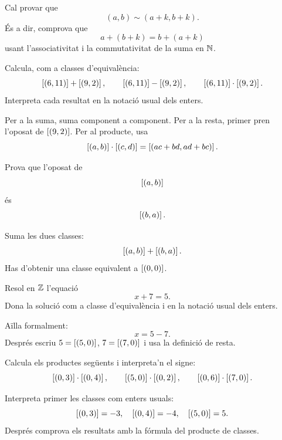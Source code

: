 \begin{indicacio}
Cal provar que
\[
(a,b)\sim(a+k,b+k).
\]
És a dir, comprova que
\[
a+(b+k)=b+(a+k)
\]
usant l'associativitat i la commutativitat de la suma en \(\mathbb{N}\).
\end{indicacio}


\begin{exercici}
Calcula, com a classes d'equivalència:
\[
\left[(6,11)\right]+\left[(9,2)\right],
\qquad
\left[(6,11)\right]-\left[(9,2)\right],
\qquad
\left[(6,11)\right]\cdot\left[(9,2)\right].
\]
Interpreta cada resultat en la notació usual dels enters.
\end{exercici}

\begin{indicacio}
Per a la suma, suma component a component. Per a la resta, primer pren l'oposat de \(\left[(9,2)\right]\). Per al producte, usa
\[
\left[(a,b)\right]\cdot\left[(c,d)\right]
=
\left[(ac+bd,ad+bc)\right].
\]
\end{indicacio}


\begin{exercici}
Prova que l'oposat de
\[
\left[(a,b)\right]
\]
és
\[
\left[(b,a)\right].
\]
\end{exercici}

\begin{indicacio}
Suma les dues classes:
\[
\left[(a,b)\right]+\left[(b,a)\right].
\]
Has d'obtenir una classe equivalent a \(\left[(0,0)\right]\).
\end{indicacio}


\begin{exercici}[Equacions de la forma \(x+a=b\)]
Resol en \(\mathbb{Z}\) l'equació
\[
x+7=5.
\]
Dona la solució com a classe d'equivalència i en la notació usual dels enters.
\end{exercici}

\begin{indicacio}
Aïlla formalment:
\[
x=5-7.
\]
Després escriu \(5=\left[(5,0)\right]\), \(7=\left[(7,0)\right]\) i usa la definició de resta.
\end{indicacio}


\begin{exercici}
Calcula els productes següents i interpreta'n el signe:
\[
\left[(0,3)\right]\cdot\left[(0,4)\right],
\qquad
\left[(5,0)\right]\cdot\left[(0,2)\right],
\qquad
\left[(0,6)\right]\cdot\left[(7,0)\right].
\]
\end{exercici}

\begin{indicacio}
Interpreta primer les classes com enters usuals:
\[
\left[(0,3)\right]=-3,\quad \left[(0,4)\right]=-4,\quad \left[(5,0)\right]=5.
\]
Després comprova els resultats amb la fórmula del producte de classes.
\end{indicacio}


